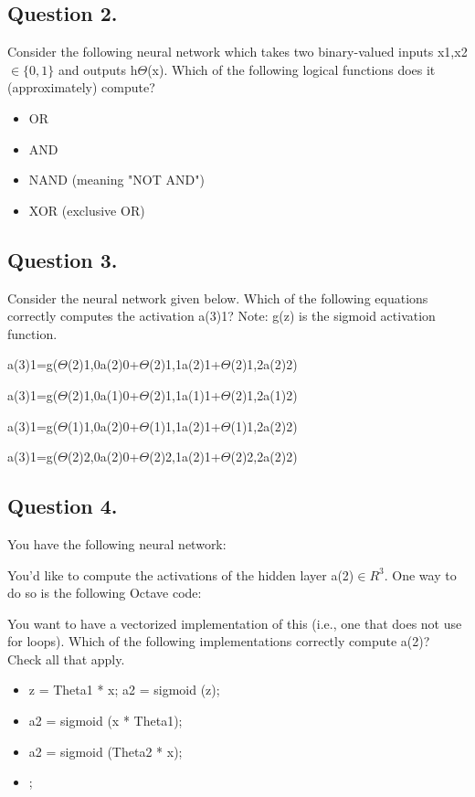 \subsection*{Question 2.} 
Consider the following neural network which takes two binary-valued inputs x1,x2 $\in \{0,1\}$ and outputs h$\Theta$(x). Which of the following logical functions does it (approximately) compute?

\begin{itemize}
	\item OR
	\item AND
	\item NAND (meaning "NOT AND")
	\item XOR (exclusive OR)
\end{itemize}





\subsection*{Question 3. }
Consider the neural network given below. Which of the following equations correctly computes the activation a(3)1? Note: g(z) is the sigmoid activation function.



a(3)1=g($\Theta$(2)1,0a(2)0+$\Theta$(2)1,1a(2)1+$\Theta$(2)1,2a(2)2)

a(3)1=g($\Theta$(2)1,0a(1)0+$\Theta$(2)1,1a(1)1+$\Theta$(2)1,2a(1)2)

a(3)1=g($\Theta$(1)1,0a(2)0+$\Theta$(1)1,1a(2)1+$\Theta$(1)1,2a(2)2)

a(3)1=g($\Theta$(2)2,0a(2)0+$\Theta$(2)2,1a(2)1+$\Theta$(2)2,2a(2)2)
\subsection*{Question 4. }
You have the following neural network:


You'd like to compute the activations of the hidden layer a(2)$\in R^3$. One way to do so is the following Octave code:


You want to have a vectorized implementation of this (i.e., one that does not use for loops). Which of the following implementations correctly compute a(2)? Check all that apply.

\begin{itemize}
\item z = Theta1 * x; a2 = sigmoid (z);

\item a2 = sigmoid (x * Theta1);

\item a2 = sigmoid (Theta2 * x);

\item {};
\end{itemize}


